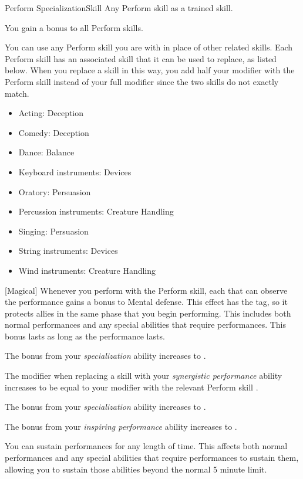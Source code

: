     \begin{feat}{Perform Specialization}{Skill}
        \featpre Any Perform skill as a trained skill.

         You gain a  bonus to all Perform skills.

         You can use any Perform skill you are  with in place of other related skills.
        Each Perform skill has an associated skill that it can be used to replace, as listed below.
        When you replace a skill in this way, you add half your modifier with the Perform skill instead of your full modifier since the two skills do not exactly match.
        \begin{itemize}
            \item Acting: Deception
            \item Comedy: Deception
            \item Dance: Balance
            \item Keyboard instruments: Devices
            \item Oratory: Persuasion
            \item Percussion instruments: Creature Handling
            \item Singing: Persuasion
            \item String instruments: Devices
            \item Wind instruments: Creature Handling
        \end{itemize}

        [Magical] Whenever you perform with the Perform skill, each  that can observe the performance gains a  bonus to Mental defense.
        This effect has the  tag, so it protects allies in the same phase that you begin performing.
        This includes both normal performances and any special abilities that require performances.
        This bonus lasts as long as the performance lasts.

         The bonus from your \textit{specialization} ability increases to .

         The modifier when replacing a skill with your \textit{synergistic performance} ability increases to be equal to your modifier with the relevant Perform skill .

         The bonus from your \textit{specialization} ability increases to .

         The bonus from your \textit{inspiring performance} ability increases to .

         You can sustain performances for any length of time.
        This affects both normal performances and any special abilities that require performances to sustain them, allowing you to sustain those abilities beyond the normal 5 minute limit.
    \end{feat}

